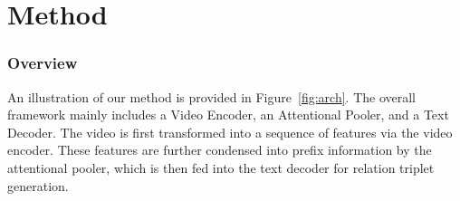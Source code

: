 \documentclass[letterpaper]{article}
\begin{document}
\section{Method}
\subsubsection{Overview}
An illustration of our method is provided in Figure~\ref{fig:arch}. The overall framework mainly includes a Video Encoder, an Attentional Pooler, and a Text Decoder. 
The video is first transformed into a sequence of features via the video encoder.
These features are further condensed into prefix information by the attentional pooler, which is then fed into the text decoder for relation triplet generation.
\end{document}
